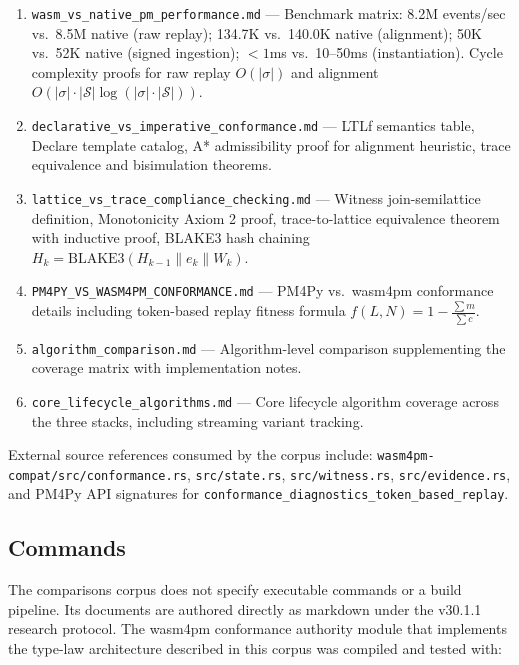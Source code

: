 \begin{enumerate}
  \item \texttt{wasm\_vs\_native\_pm\_performance.md} --- Benchmark matrix:
    8.2M events/sec vs.\ 8.5M native (raw replay); 134.7K vs.\ 140.0K native
    (alignment); 50K vs.\ 52K native (signed ingestion); $< 1$ms vs.\ 10--50ms
    (instantiation). Cycle complexity proofs for raw replay $O(|\sigma|)$ and
    alignment $O(|\sigma| \cdot |\mathcal{S}| \log(|\sigma| \cdot |\mathcal{S}|))$.
  \item \texttt{declarative\_vs\_imperative\_conformance.md} --- LTLf semantics
    table, Declare template catalog, A* admissibility proof for alignment
    heuristic, trace equivalence and bisimulation theorems.
  \item \texttt{lattice\_vs\_trace\_compliance\_checking.md} --- Witness
    join-semilattice definition, Monotonicity Axiom 2 proof, trace-to-lattice
    equivalence theorem with inductive proof, BLAKE3 hash chaining
    $H_k = \text{BLAKE3}(H_{k-1} \| e_k \| W_k)$.
  \item \texttt{PM4PY\_VS\_WASM4PM\_CONFORMANCE.md} --- PM4Py vs.\ wasm4pm
    conformance details including token-based replay fitness formula
    $f(L, N) = 1 - \frac{\sum m}{\sum c}$.
  \item \texttt{algorithm\_comparison.md} --- Algorithm-level comparison
    supplementing the coverage matrix with implementation notes.
  \item \texttt{core\_lifecycle\_algorithms.md} --- Core lifecycle algorithm
    coverage across the three stacks, including streaming variant tracking.
\end{enumerate}

External source references consumed by the corpus include:
\texttt{wasm4pm-compat/src/conformance.rs}, \texttt{src/state.rs},
\texttt{src/witness.rs}, \texttt{src/evidence.rs}, and PM4Py API signatures for
\texttt{conformance\_diagnostics\_token\_based\_replay}.

\subsection{Commands}
\label{sec:comparisons-impl-commands}

The comparisons corpus does not specify executable commands or a build pipeline.
Its documents are authored directly as markdown under the v30.1.1 research
protocol. The wasm4pm conformance authority module that implements the type-law
architecture described in this corpus was compiled and tested with:

